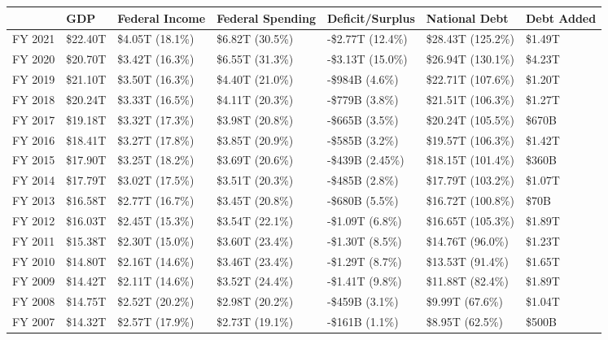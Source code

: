 \documentclass{article}
\begin{document}
    \begin{table}[H]
      \begin{tabular}{|l|l|l|l|l|l|l|}
      \hline
      & GDP & Federal Income & Federal Spending & Deficit/Surplus & National Debt & Debt Added \\ \hline
      FY 2021 & \$22.40T & \$4.05T (18.1\%) & \$6.82T (30.5\%) & -\$2.77T (12.4\%) & \$28.43T (125.2\%) & \$1.49T \\ \hline
      FY 2020 & \$20.70T & \$3.42T (16.3\%) & \$6.55T (31.3\%) & -\$3.13T (15.0\%) & \$26.94T (130.1\%) & \$4.23T \\ \hline
      FY 2019 & \$21.10T & \$3.50T (16.3\%) & \$4.40T (21.0\%) & -\$984B (4.6\%) & \$22.71T (107.6\%) & \$1.20T \\ \hline
      FY 2018 & \$20.24T & \$3.33T (16.5\%) & \$4.11T (20.3\%) & -\$779B (3.8\%) & \$21.51T (106.3\%) & \$1.27T \\ \hline
      FY 2017 & \$19.18T & \$3.32T (17.3\%) & \$3.98T (20.8\%) & -\$665B (3.5\%) & \$20.24T (105.5\%) & \$670B \\ \hline
      FY 2016 & \$18.41T & \$3.27T (17.8\%) & \$3.85T (20.9\%) & -\$585B (3.2\%) & \$19.57T (106.3\%) & \$1.42T \\ \hline
      FY 2015 & \$17.90T & \$3.25T (18.2\%) & \$3.69T (20.6\%) & -\$439B (2.45\%) & \$18.15T (101.4\%) & \$360B \\ \hline
      FY 2014 & \$17.79T & \$3.02T (17.5\%) & \$3.51T (20.3\%) & -\$485B (2.8\%) & \$17.79T (103.2\%) & \$1.07T \\ \hline
      FY 2013 & \$16.58T & \$2.77T (16.7\%) & \$3.45T (20.8\%) & -\$680B (5.5\%) & \$16.72T (100.8\%) & \$70B \\ \hline
      FY 2012 & \$16.03T & \$2.45T (15.3\%) & \$3.54T (22.1\%) & -\$1.09T (6.8\%) & \$16.65T (105.3\%) & \$1.89T \\ \hline
      FY 2011 & \$15.38T & \$2.30T (15.0\%) & \$3.60T (23.4\%) & -\$1.30T (8.5\%) & \$14.76T (96.0\%) & \$1.23T \\ \hline
      FY 2010 & \$14.80T & \$2.16T (14.6\%) & \$3.46T (23.4\%) & -\$1.29T (8.7\%) & \$13.53T (91.4\%) & \$1.65T \\ \hline
      FY 2009 & \$14.42T & \$2.11T (14.6\%) & \$3.52T (24.4\%) & -\$1.41T (9.8\%) & \$11.88T (82.4\%) & \$1.89T \\ \hline
      FY 2008 & \$14.75T & \$2.52T (20.2\%) & \$2.98T (20.2\%) & -\$459B (3.1\%) & \$9.99T (67.6\%) & \$1.04T \\ \hline
      FY 2007 & \$14.32T & \$2.57T (17.9\%) & \$2.73T (19.1\%) & -\$161B (1.1\%) & \$8.95T (62.5\%) & \$500B \\ \hline

\end{tabular}
\end{table}
\end{document}
